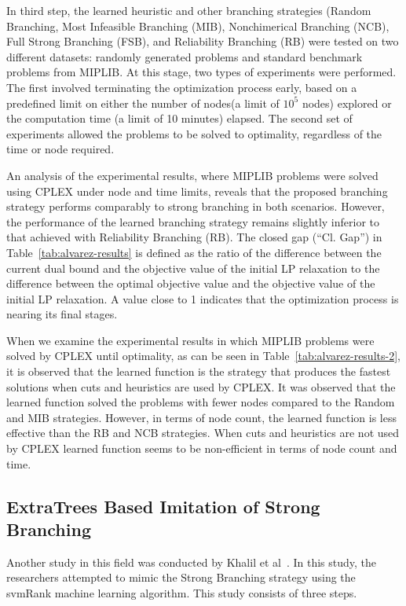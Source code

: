 In third step, the learned heuristic and other branching strategies (Random Branching, Most Infeasible Branching (MIB), Nonchimerical Branching (NCB), Full Strong Branching (FSB), and Reliability Branching (RB) were tested on two different datasets: randomly generated problems and standard benchmark problems from MIPLIB.
At this stage, two types of experiments were performed.
The first involved terminating the optimization process early, based on a predefined limit on either the number of nodes(a limit of $10^5$ nodes) explored or the computation time (a limit of 10 minutes) elapsed.
The second set of experiments allowed the problems to be solved to optimality, regardless of the time or node required.


An analysis of the experimental results, where MIPLIB problems were solved using CPLEX under node and time limits, reveals that the proposed branching strategy performs comparably to strong branching in both scenarios.
However, the performance of the learned branching strategy remains slightly inferior to that achieved with Reliability Branching (RB).
The closed gap (“Cl. Gap”) in Table~\ref{tab:alvarez-results} is defined as the ratio of the difference between the current dual bound and the objective value of the initial LP relaxation to the difference between the optimal objective value and the objective value of the initial LP relaxation.
A value close to 1 indicates that the optimization process is nearing its final stages.




When we examine the experimental results in which MIPLIB problems were solved by CPLEX until optimality, as can be seen in Table~\ref{tab:alvarez-results-2}, it is observed that the learned function is the strategy that produces the fastest solutions when cuts and heuristics are used by CPLEX.
It was observed that the learned function solved the problems with fewer nodes compared to the Random and MIB strategies.
However, in terms of node count, the learned function is less effective than the RB and NCB strategies.
When cuts and heuristics are not used by CPLEX learned function seems to be non-efficient in terms of node count and time.




\subsection{ExtraTrees Based Imitation of Strong Branching}
Another study in this field was conducted by Khalil et al~\cite{khalilLearningBranchMixed2016}.
In this study, the researchers attempted to mimic the Strong Branching strategy using the svmRank machine learning algorithm.
This study consists of three steps.


